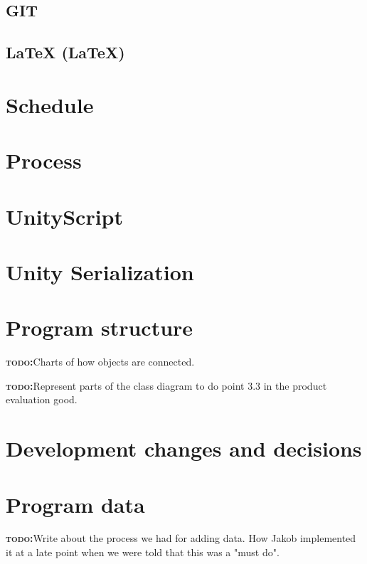 \documentclass[BSP,english,oneside]{classes/gucthesis}
\newcommand{\todo}[1]{{\par\noindent\textbf{\textsc{\color{Gray}todo:}}\color{green}#1}}
\begin{document}
		\section{GIT}
			

		\section{LaTeX (\LaTeX)}
			


	\chapter{Schedule}
		

	\chapter{Process}
		

	\chapter{UnityScript}
		\label{chap:UnityScript}
		

	\chapter{Unity Serialization}
		\label{chap:UnitySerialization}
		

	\chapter{Program structure}
		\todo{Charts of how objects are connected.}
		\todo{Represent parts of the class diagram to do point 3.3 in the 
		product evaluation good.}

	\chapter{Development changes and decisions}
		\label{chap:Developmentchangesanddecisions}
		

	\chapter{Program data}
		\todo{Write about the process we had for adding data. How Jakob 
		implemented it at a late point when we were told that this was a 
		"must do".}
\end{document}
